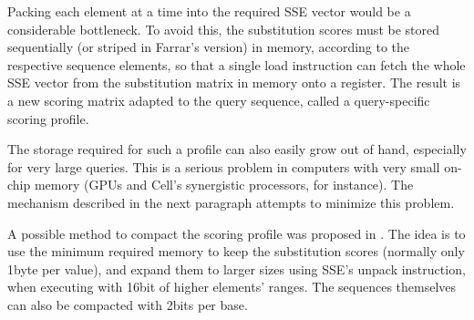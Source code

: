 Packing each element at a time into the required SSE vector would be a considerable bottleneck. To avoid this, the substitution scores must be stored sequentially (or striped in Farrar's version) in memory, according to the respective sequence elements, so that a single load instruction can fetch the whole SSE vector from the substitution matrix in memory onto a register. The result is a new scoring matrix adapted to the query sequence, called a query-specific scoring profile.

The storage required for such a profile can also easily grow out of hand, especially for very large queries. This is a serious problem in computers with very small on-chip memory (GPUs and Cell's synergistic processors, for instance). The mechanism described in the next paragraph attempts to minimize this problem. 
		

A possible method to compact the scoring profile was proposed in \cite{swps3}. The idea is to use the minimum required memory to keep the substitution scores (normally only 1byte per value), and expand them to larger sizes using SSE's unpack instruction, when executing with 16bit of higher elements' ranges. The sequences themselves can also be compacted with 2bits per base. 


	

